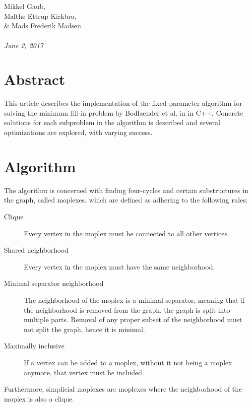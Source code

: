 \documentclass{article}
\begin{document}
\begin{titlepage}
		 \\ \\
		Mikkel Gaub, \\ Malthe Ettrup Kirkbro, \\ \& Mads Frederik Madsen	\\ \\
		\hspace{-18pt}
		\textit{June 2, 2017}
		\thispagestyle{empty}
		\vspace{\fill}
		\section*{Abstract}
		This article describes the implementation of the fixed-parameter algorithm for solving the minimum fill-in problem by Bodlaender et al. in \cite{algorithm} in C++. Concrete solutions for each subproblem in the algorithm is described and several optimizations are explored, with varying success.
	\end{titlepage}
	\clearpage

	\section{Algorithm}
	The algorithm\cite{algorithm} is concerned with finding four-cycles and certain substructures in the graph, called moplexes, which are defined as adhering to the following rules: \\

	\begin{description}
		\item[Clique] Every vertex in the moplex must be connected to all other vertices.
		\item[Shared neighborhood] Every vertex in the moplex must have the same neighborhood.
		\item[Minimal separator neighborhood] The neighborhood of the moplex is a minimal separator, meaning that if the neighborhood is removed from the graph, the graph is split into multiple parts. Removal of any proper subset of the neighborhood must not split the graph, hence it is minimal.
		\item[Maximally inclusive] If a vertex can be added to a moplex, without it not being a moplex anymore, that vertex must be included.
	\end{description}

	Furthermore, simplicial moplexes are moplexes where the neighborhood of the moplex is also a clique.
\end{document}
